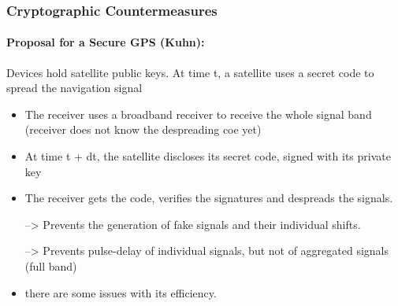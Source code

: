 \subsubsection{Cryptographic Countermeasures}
\paragraph{Proposal for a Secure GPS (Kuhn):} Devices hold satellite public keys. At time t, a satellite uses a secret code to spread the navigation signal
\begin{itemize}
    \item The receiver uses a broadband receiver to receive the whole signal band (receiver does not know the despreading coe yet)
    \item At time t + dt, the satellite discloses its secret code, signed with its private key
    \item The receiver gets the code, verifies the signatures and despreads the signals.
    \item[-->] Prevents the generation of fake signals and their individual shifts.
    \item [-->] Prevents pulse-delay of individual signals, but not of aggregated signals (full band)
    \item there are some issues with its efficiency.
\end{itemize}
